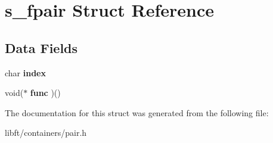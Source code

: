 \hypertarget{structs__fpair}{}\section{s\+\_\+fpair Struct Reference}
\label{structs__fpair}
\subsection*{Data Fields}
\begin{DoxyCompactItemize}
\item 
\hypertarget{structs__fpair_a8f564a8b3781dfabef60c05915da85f8}{}char {\bfseries index}\label{structs__fpair_a8f564a8b3781dfabef60c05915da85f8}

\item 
\hypertarget{structs__fpair_ac98d5d20f5aab3ef51e0ff5e30d16925}{}void($\ast$ {\bfseries func} )()\label{structs__fpair_ac98d5d20f5aab3ef51e0ff5e30d16925}

\end{DoxyCompactItemize}


The documentation for this struct was generated from the following file\+:\begin{DoxyCompactItemize}
\item 
libft/containers/pair.\+h\end{DoxyCompactItemize}

